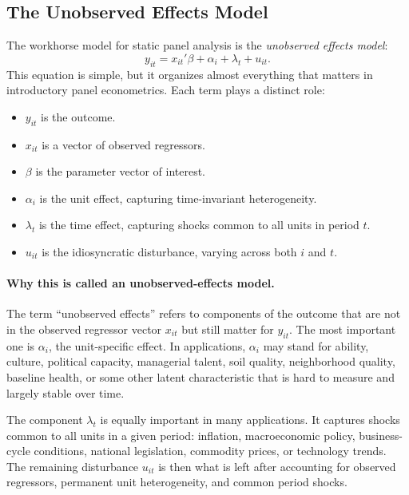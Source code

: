 \subsection{The Unobserved Effects Model}
The workhorse model for static panel analysis is the \emph{unobserved effects model}:
\begin{equation}
y_{it} = x_{it}'\beta + \alpha_i + \lambda_t + u_{it}.
\label{eq:uem}
\end{equation}
This equation is simple, but it organizes almost everything that matters in introductory panel econometrics. Each term plays a distinct role:
\begin{itemize}
\item $y_{it}$ is the outcome.
\item $x_{it}$ is a vector of observed regressors.
\item $\beta$ is the parameter vector of interest.
\item $\alpha_i$ is the unit effect, capturing time-invariant heterogeneity.
\item $\lambda_t$ is the time effect, capturing shocks common to all units in period $t$.
\item $u_{it}$ is the idiosyncratic disturbance, varying across both $i$ and $t$.
\end{itemize}

\paragraph{Why this is called an unobserved-effects model.}
The term ``unobserved effects'' refers to components of the outcome that are not in the observed regressor vector $x_{it}$ but still matter for $y_{it}$. The most important one is $\alpha_i$, the unit-specific effect. In applications, $\alpha_i$ may stand for ability, culture, political capacity, managerial talent, soil quality, neighborhood quality, baseline health, or some other latent characteristic that is hard to measure and largely stable over time.

The component $\lambda_t$ is equally important in many applications. It captures shocks common to all units in a given period: inflation, macroeconomic policy, business-cycle conditions, national legislation, commodity prices, or technology trends. The remaining disturbance $u_{it}$ is then what is left after accounting for observed regressors, permanent unit heterogeneity, and common period shocks.

